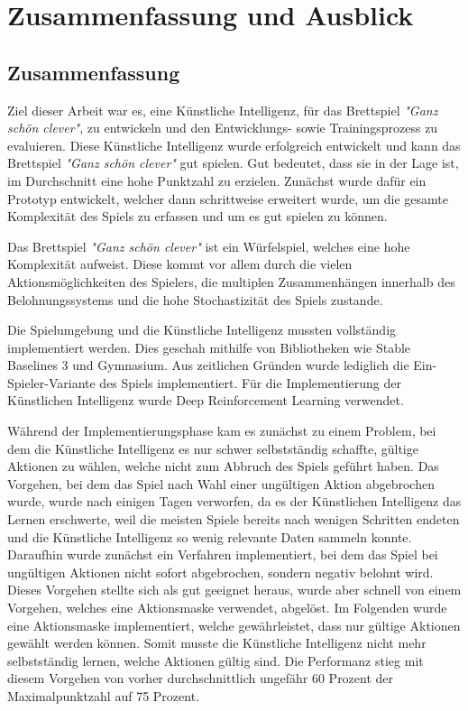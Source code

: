 \section{Zusammenfassung und Ausblick}
\subsection{Zusammenfassung}
Ziel dieser Arbeit war es, eine Künstliche Intelligenz, für das Brettspiel \textit{"Ganz schön clever"}, zu entwickeln und den Entwicklungs- sowie Trainingsprozess zu evaluieren.
Diese Künstliche Intelligenz wurde erfolgreich entwickelt und kann das Brettspiel \textit{"Ganz schön clever"} gut spielen. Gut bedeutet, dass sie in der Lage ist, im Durchschnitt eine hohe Punktzahl zu erzielen. Zunächst wurde dafür ein Prototyp entwickelt, welcher dann schrittweise erweitert wurde, um die gesamte Komplexität des Spiels zu erfassen und um es gut spielen zu können.

Das Brettspiel \textit{"Ganz schön clever"} ist ein Würfelspiel, welches eine hohe Komplexität aufweist. Diese kommt vor allem durch die vielen Aktionsmöglichkeiten des Spielers, die multiplen Zusammenhängen innerhalb des Belohnungssystems und die hohe Stochastizität des Spiels zustande.

Die Spielumgebung und die Künstliche Intelligenz mussten vollständig implementiert werden. Dies geschah mithilfe von Bibliotheken wie Stable Baselines 3 und Gymnasium. Aus zeitlichen Gründen wurde lediglich die Ein-Spieler-Variante des Spiels implementiert. Für die Implementierung der Künstlichen Intelligenz wurde Deep Reinforcement Learning verwendet.

Während der Implementierungsphase kam es zunächst zu einem Problem, bei dem die Künstliche Intelligenz es nur schwer selbstständig schaffte, gültige Aktionen zu wählen, welche nicht zum Abbruch des Spiels geführt haben. Das Vorgehen, bei dem das Spiel nach Wahl einer ungültigen Aktion abgebrochen wurde, wurde nach einigen Tagen verworfen, da es der Künstlichen Intelligenz das Lernen erschwerte, weil die meisten Spiele bereits nach wenigen Schritten endeten und die Künstliche Intelligenz so wenig relevante Daten sammeln konnte. Daraufhin wurde zunächst ein Verfahren implementiert, bei dem das Spiel bei ungültigen Aktionen nicht sofort abgebrochen, sondern negativ belohnt wird. Dieses Vorgehen stellte sich als gut geeignet heraus, wurde aber schnell von einem Vorgehen, welches eine Aktionsmaske verwendet, abgelöst. Im Folgenden wurde eine Aktionsmaske implementiert, welche gewährleistet, dass nur gültige Aktionen gewählt werden können. Somit musste die Künstliche Intelligenz nicht mehr selbstständig lernen, welche Aktionen gültig sind. Die Performanz stieg mit diesem Vorgehen von vorher durchschnittlich ungefähr 60 Prozent der Maximalpunktzahl auf 75 Prozent.

